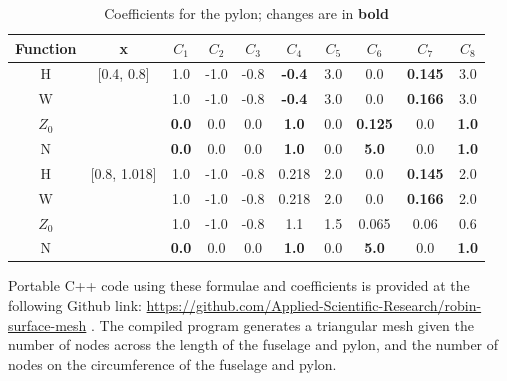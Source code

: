 \documentclass[journal]{new-aiaa}
\begin{document}
\begin{table}[ht]
\caption{Coefficients for the pylon; changes are in \textbf{bold}}
\centering
\begin{tabular}{cccccccccc}
Function & x & $C_{1}$ & $C_{2}$ & $C_{3}$ & $C_{4}$ & $C_{5}$ & $C_{6}$ & $C_{7}$ & $C_{8}$ \\
\hline
H          & [0.4, 0.8]  & 1.0             & -1.0 & -0.8 & \textbf{-0.4} & 3.0 & 0.0                  & \textbf{0.145} & 3.0 \\
W          &                 & 1.0             & -1.0 & -0.8 & \textbf{-0.4} & 3.0 & 0.0                  & \textbf{0.166} & 3.0 \\
$Z_{0}$ &                 & \textbf{0.0} & 0.0  & 0.0  & \textbf{1.0}  & 0.0  & \textbf{0.125} & 0.0                 & \textbf{1.0} \\
N           &                 & \textbf{0.0} & 0.0  & 0.0  & \textbf{1.0}  & 0.0  & \textbf{5.0}     & 0.0                 & \textbf{1.0} \\
\hline
H          & [0.8, 1.018]  & 1.0             & -1.0 & -0.8 & 0.218         & 2.0 & 0.0                 & \textbf{0.145} & 2.0 \\
W          &                     & 1.0             & -1.0 & -0.8 & 0.218         & 2.0 & 0.0                 & \textbf{0.166} & 2.0 \\
$Z_{0}$ &                     & 1.0             & -1.0 & -0.8 & 1.1             & 1.5 & 0.065             & 0.06               & 0.6 \\
N           &                     & \textbf{0.0} & 0.0  & 0.0  & \textbf{1.0} & 0.0 & \textbf{5.0}     & 0.0                 & \textbf{1.0} \\
\end{tabular}
\label{pycoeff}
\end{table}

Portable C++ code using these formulae and coefficients is provided at the following Github link:
\url{https://github.com/Applied-Scientific-Research/robin-surface-mesh} \cite{robinsurfmesh}.
The compiled program generates a triangular mesh given the number of nodes across the length of the fuselage and pylon, 
and the number of nodes on the circumference of the fuselage and pylon.

%

\end{document}

